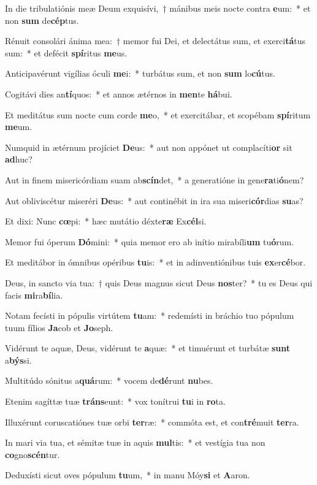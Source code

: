 \item In die tribulatiónis meæ Deum exquisívi,~† mánibus meis nocte contra \textbf{e}um:~* et non \textbf{sum} de\textbf{cép}tus.
\item Rénuit consolári ánima mea:~† memor fui Dei, et delectátus sum, et exerci\textbf{tá}tus sum:~* et defécit \textbf{spí}ritus \textbf{me}us.
\item Anticipavérunt vigílias óculi \textbf{me}i:~* turbátus sum, et non \textbf{sum} lo\textbf{cú}tus.
\item Cogitávi dies an\textbf{tí}quos:~* et annos ætérnos in \textbf{men}te \textbf{há}bui.
\item Et meditátus sum nocte cum corde \textbf{me}o,~* et exercitábar, et scopébam \textbf{spí}ritum \textbf{me}um.
\item Numquid in ætérnum projíciet \textbf{De}us:~* aut non appónet ut complacíti\textbf{or} sit \textbf{ad}huc?
\item Aut in finem misericórdiam suam ab\textbf{scín}det,~* a generatióne in gene\textbf{ra}ti\textbf{ó}nem?
\item Aut obliviscétur miseréri \textbf{De}us:~* aut continébit in ira sua miseri\textbf{cór}dias \textbf{su}as?
\item Et dixi: Nunc \textbf{cœ}pi:~* hæc mutátio déxte\textbf{ræ} Ex\textbf{cél}si.
\item Memor fui óperum \textbf{Dó}mini:~* quia memor ero ab inítio mirabíli\textbf{um} tu\textbf{ó}rum.
\item Et meditábor in ómnibus opéribus \textbf{tu}is:~* et in adinventiónibus tuis \textbf{ex}er\textbf{cé}bor.
\item Deus, in sancto via tua:~† quis Deus magnus sicut Deus \textbf{nos}ter?~* tu es Deus qui facis \textbf{mi}ra\textbf{bí}lia.
\item Notam fecísti in pópulis virtútem \textbf{tu}am:~* redemísti in bráchio tuo pópulum tuum fílios \textbf{Ja}cob et \textbf{Jo}seph.
\item Vidérunt te aquæ, Deus, vidérunt te \textbf{a}quæ:~* et timuérunt et turbátæ \textbf{sunt} a\textbf{býs}si.
\item Multitúdo sónitus a\textbf{quá}rum:~* vocem de\textbf{dé}runt \textbf{nu}bes.
\item Etenim sagíttæ tuæ \textbf{tráns}eunt:~* vox tonítrui \textbf{tu}i in \textbf{ro}ta.
\item Illuxérunt coruscatiónes tuæ orbi \textbf{ter}ræ:~* commóta est, et con\textbf{tré}muit \textbf{ter}ra.
\item In mari via tua, et sémitæ tuæ in aquis \textbf{mul}tis:~* et vestígia tua non \textbf{co}gno\textbf{scén}tur.
\item Deduxísti sicut oves pópulum \textbf{tu}um,~* in manu Móy\textbf{si} et \textbf{A}aron.
